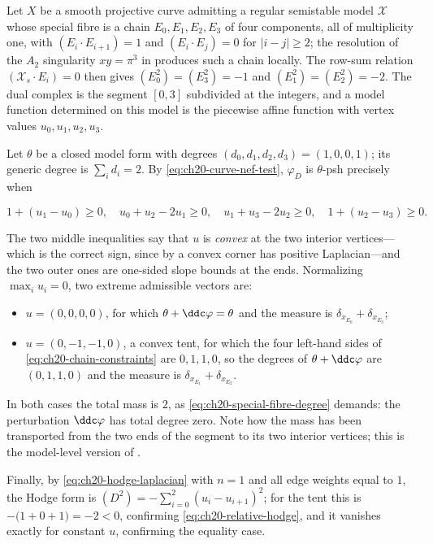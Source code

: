 \begin{example}
\label{ex:ch20-chain-three}
Let $X$ be a smooth projective curve admitting a regular semistable model
$\mathcal X$ whose special fibre is a chain
$E_0,E_1,E_2,E_3$ of four components, all of multiplicity one, with
$(E_{i}\cdot E_{i+1})=1$ and $(E_i\cdot E_j)=0$ for $|i-j|\geq2$; the
resolution of the $A_2$ singularity $xy=\pi^3$ in
 produces such a chain locally.  The row-sum relation
$(\mathcal X_s\cdot E_i)=0$ then gives $(E_0^2)=(E_3^2)=-1$ and
$(E_1^2)=(E_2^2)=-2$.  The dual complex is the segment $[0,3]$
subdivided at the integers, and a model function determined on this model is
the piecewise affine function with vertex values $u_0,u_1,u_2,u_3$.

Let $\theta$ be a closed model form with degrees
$(d_0,d_1,d_2,d_3)=(1,0,0,1)$; its generic degree is
$\sum_id_i=2$.  By \eqref{eq:ch20-curve-nef-test}, $\varphi_D$ is
$\theta$-psh precisely when

\begin{equation}
\label{eq:ch20-chain-constraints}
 1+(u_1-u_0)\geq0,\quad
 u_0+u_2-2u_1\geq0,\quad
 u_1+u_3-2u_2\geq0,\quad
 1+(u_2-u_3)\geq0 .
\end{equation}

The two middle inequalities say that $u$ is \emph{convex} at the two
interior vertices---which is the correct sign, since by
 a convex corner has positive
Laplacian---and the two outer ones are one-sided slope bounds at the ends.
Normalizing $\max_iu_i=0$, two extreme admissible vectors are:

\begin{itemize}
\item $u=(0,0,0,0)$, for which $\theta+\ddc\varphi=\theta$ and the
 measure is $\delta_{x_{E_0}}+\delta_{x_{E_3}}$;
\item $u=(0,-1,-1,0)$, a convex tent, for which the four left-hand sides of
 \eqref{eq:ch20-chain-constraints} are $0,1,1,0$, so the degrees of
 $\theta+\ddc\varphi$ are $(0,1,1,0)$ and the measure is
 $\delta_{x_{E_1}}+\delta_{x_{E_2}}$.
\end{itemize}

In both cases the total mass is $2$, as
\eqref{eq:ch20-special-fibre-degree} demands: the perturbation
$\ddc\varphi$ has total degree zero.  Note how the mass has been
transported from the two ends of the segment to its two interior vertices;
this is the model-level version of .

Finally, by \eqref{eq:ch20-hodge-laplacian} with $n=1$ and all edge
weights equal to $1$, the Hodge form is
$(D^2)=-\sum_{i=0}^{2}(u_i-u_{i+1})^2$; for the tent this is
$-\bigl(1+0+1\bigr)=-2<0$, confirming
\eqref{eq:ch20-relative-hodge}, and it vanishes exactly for constant $u$,
confirming the equality case.
\end{example}

